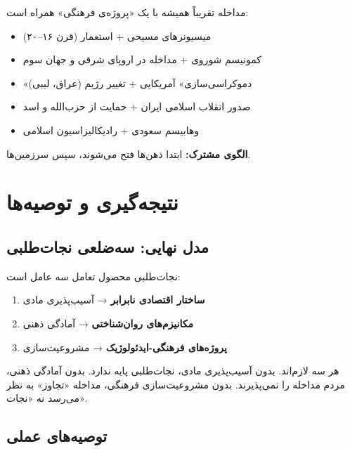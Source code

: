 مداخله تقریباً همیشه با یک «پروژه‌ی فرهنگی» همراه است:
\begin{itemize}
\item میسیونرهای مسیحی + استعمار (قرن ۱۶–۲۰)
\item کمونیسم شوروی + مداخله در اروپای شرقی و جهان سوم
\item «دموکراسی‌سازی» آمریکایی + تغییر رژیم (عراق، لیبی)
\item صدور انقلاب اسلامی ایران + حمایت از حزب‌الله و اسد
\item وهابیسم سعودی + رادیکالیزاسیون اسلامی
\end{itemize}

\textbf{الگوی مشترک:} ابتدا ذهن‌ها فتح می‌شوند، سپس سرزمین‌ها.


\section{نتیجه‌گیری و توصیه‌ها}
\label{sec:app-a-recommendations}

\subsection{مدل نهایی: سه‌ضلعی نجات‌طلبی}

نجات‌طلبی محصول تعامل سه عامل است:

\begin{enumerate}
\item \textbf{ساختار اقتصادی نابرابر} → آسیب‌پذیری مادی
\item \textbf{مکانیزم‌های روان‌شناختی} → آمادگی ذهنی
\item \textbf{پروژه‌های فرهنگی-ایدئولوژیک} → مشروعیت‌سازی
\end{enumerate}

هر سه لازم‌اند. بدون آسیب‌پذیری مادی، نجات‌طلبی پایه ندارد. بدون آمادگی ذهنی، مردم مداخله را نمی‌پذیرند. بدون مشروعیت‌سازی فرهنگی، مداخله «تجاوز» به نظر می‌رسد نه «نجات».

\subsection{توصیه‌های عملی}

